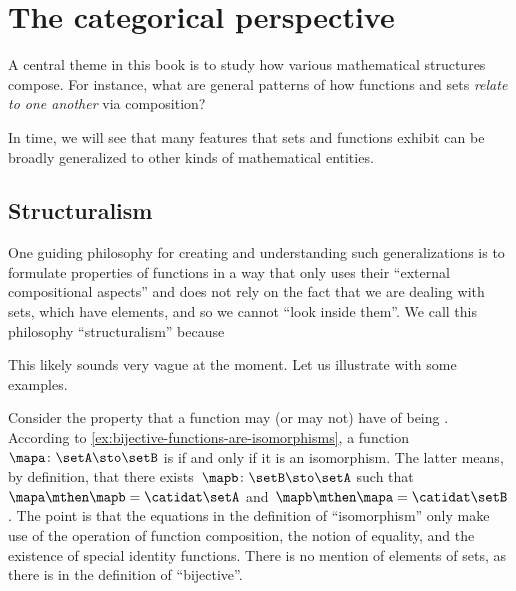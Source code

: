 \section{The categorical perspective}
\label{sec:categorical perspective}


A central theme in this book is to study how various mathematical structures compose.
For instance, what are general patterns of how functions and sets \emph{relate to one another} via composition?

In time, we will see that many features that sets and functions exhibit can be broadly generalized to other kinds of mathematical entities.

\subsection{Structuralism}

One guiding philosophy for creating and understanding such generalizations is to formulate properties of functions in a way that only uses their ``external compositional aspects'' and does not rely on the fact that we are dealing with sets, which have elements, and so we cannot ``look inside them''.
We call this philosophy ``structuralism'' because


This likely sounds very vague at the moment.
Let us illustrate with some examples.

\begin{example}
    Consider the property that a function may (or may not) have of being .
    According to \cref{ex:bijective-functions-are-isomorphisms}, a function~$\mapa\colon \setA \sto \setB$ is  if and only if it is an isomorphism.
    The latter means, by definition, that there exists~$\mapb \colon \setB \sto \setA$ such that~$\mapa \mthen \mapb = \catidat\setA$ and~$\mapb \mthen \mapa = \catidat\setB$.
    The point is that the equations in the definition of ``isomorphism'' only make use of the operation of function composition, the notion of equality, and the existence of special identity functions.
    There is no mention of elements of sets, as there is in the definition of ``bijective''.
\end{example}

